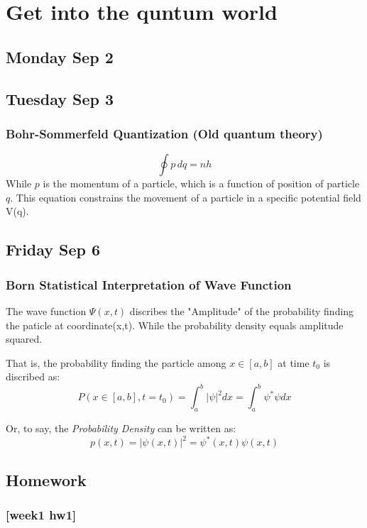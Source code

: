 \section{Get into the quntum world}\SectionRule
    \subsection{\hfill \small Monday Sep 2}
    \subsection{\hfill\small Tuesday Sep 3}
    \subsubsection*{Bohr-Sommerfeld Quantization (Old quantum theory)}
    \[
        \oint p \,dq = nh
    \]
    While $p$ is the momentum of a particle, which is a function of position of particle $q$. This equation constrains the movement of a particle in a specific potential field V(q).
    \subsection{\hfill \small Friday Sep 6}
    \subsubsection*{Born Statistical Interpretation of Wave Function}
    The wave function $\Psi (x,t)$ discribes the "Amplitude" of the probability finding the paticle at coordinate(x,t). While the probability density equals amplitude squared.

    That is, the probability finding the particle among $x\in [a,b]$ at time $t_0$ is discribed as:
    \begin{equation*}
        P(x\in [a,b],t=t_0)=\int^{b}_{a}|\psi|^{2}dx=\int^{b}_{a}\psi^*\psi dx
    \end{equation*}

    Or, to say, the \textit{Probability Density} can be written as:
    \begin{equation*}
        p(x,t)=|\psi(x,t)|^2=\psi^{*}(x,t)\psi(x,t)
    \end{equation*}
    
    \subsection*{Homework}
        \subsubsection*{[week1 hw1]}
